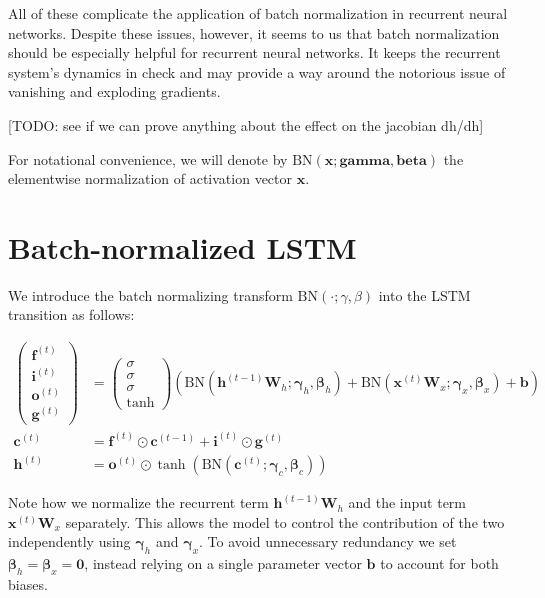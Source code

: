 \documentclass{article} %
\newcommand{\vect}[1]{\mathbf{#1}}
\newcommand{\mat}[1]{\mathbf{#1}}
\newcommand{\ewprod}{\odot}
\begin{document}
All of these complicate the application of batch normalization in recurrent neural networks.
Despite these issues, however, it seems to us that batch normalization should be especially helpful for recurrent neural networks.
It keeps the recurrent system's dynamics in check and may provide a way around the notorious issue of vanishing and exploding gradients.

[TODO: see if we can prove anything about the effect on the jacobian dh/dh]

For notational convenience, we will denote by $\mathrm{BN}(\vect{x}; \vect{gamma}, \vect{beta})$ the elementwise normalization of activation vector $\vect{x}$.

\section{Batch-normalized LSTM}

We introduce the batch normalizing transform $\mathrm{BN}(\cdot; \gamma, \beta)$ into the LSTM transition as follows:

\begin{align}
\left(\begin{array}{ccc}
\vect{f}^{(t)} \\
\vect{i}^{(t)} \\
\vect{o}^{(t)} \\
\vect{g}^{(t)}
\end{array}\right)
 &=
\left(\begin{array}{ccc}
\sigma \\
\sigma \\
\sigma \\
\tanh
\end{array}\right)
\left(
 \mathrm{BN} (\vect{h}^{(t-1)} \mat{W}_h; \vect{\gamma}_h, \vect{\beta}_h) +
 \mathrm{BN} (\vect{x}^{(t)}   \mat{W}_x; \vect{\gamma}_x, \vect{\beta}_x) +
 \vect{b}
\right) \\
\vect{c}^{(t)} &= \vect{f}^{(t)} \ewprod \vect{c}^{(t-1)} +
                  \vect{i}^{(t)} \ewprod \vect{g}^{(t)} \\
\vect{h}^{(t)} &= \vect{o}^{(t)} \ewprod \tanh(
 \mathrm{BN} (\vect{c}^{(t)}; \vect{\gamma}_c, \vect{\beta}_c)
)
\end{align}

Note how we normalize the recurrent term $\vect{h}^{(t-1)} \mat{W}_h$ and the input term $\vect{x}^{(t)} \mat{W}_x$ separately.
This allows the model to control the contribution of the two independently using $\vect{\gamma}_h$ and $\vect{\gamma}_x$.
To avoid unnecessary redundancy we set $\vect{\beta}_h = \vect{\beta}_x = \vect{0}$, instead relying on a single parameter vector $\vect{b}$ to account for both biases.
\end{document}
